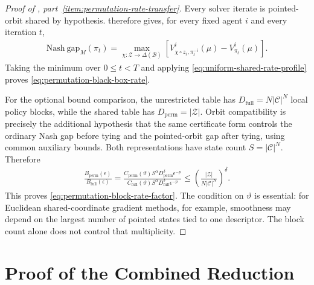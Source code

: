 \documentclass{article}
\theoremstyle{plain}
\theoremstyle{definition}
\theoremstyle{remark}
\newcommand{\Nash}{\mathrm{Nash\ gap}}
\newcommand{\abs}[1]{\left\lvert#1\right\rvert}
\begin{document}
\begin{proof}[Proof of ,
part~\ref{item:permutation-rate-transfer}]
Every solver iterate is pointed-orbit shared by hypothesis.
 therefore gives, for every
fixed agent $i$ and every iteration $t$,
\begin{align*}
  \Nash_M(\pi_t)
  =
  \max_{\chi:\mathcal Z\to\Delta(\mathcal B)}
  \left[
    V^i_{\chi\circ z_i,\pi_t^{-i}}(\mu)
    -
    V^i_{\pi_t}(\mu)
  \right].
\end{align*}
Taking the minimum over $0\le t<T$ and applying
\eqref{eq:uniform-shared-rate-profile} proves
\eqref{eq:permutation-black-box-rate}.

For the optional bound comparison, the unrestricted table has
$D_{\mathrm{full}}=N\abs{\mathcal C}^{N}$ local policy blocks, while the
shared table has $D_{\mathrm{perm}}=\abs{\mathcal Z}$. Orbit compatibility is
precisely the additional hypothesis that the same certificate form controls the
ordinary Nash gap before tying and the pointed-orbit gap after tying, using
common auxiliary bounds. Both representations have state count
$S=\abs{\mathcal C}^{N}$. Therefore
\begin{align*}
  \frac{B_{\mathrm{perm}}(\epsilon)}
       {B_{\mathrm{full}}(\epsilon)}
  =
  \frac{
    C_{\mathrm{perm}}(\vartheta)
    S^\alpha D_{\mathrm{perm}}^\delta\epsilon^{-p}
  }{
    C_{\mathrm{full}}(\vartheta)
    S^\alpha D_{\mathrm{full}}^\delta\epsilon^{-p}
  }
  \le
  \left(
    \frac{\abs{\mathcal Z}}
         {N\abs{\mathcal C}^{N}}
  \right)^\delta.
\end{align*}
This proves \eqref{eq:permutation-block-rate-factor}. The condition on
$\vartheta$ is essential: for Euclidean shared-coordinate gradient methods, for
example, smoothness may depend on the largest number of pointed states tied to
one descriptor. The block count alone does not control that multiplicity.
\end{proof}

\section{Proof of the Combined Reduction}
\label{app:proof-combined-reductions}
\end{document}
